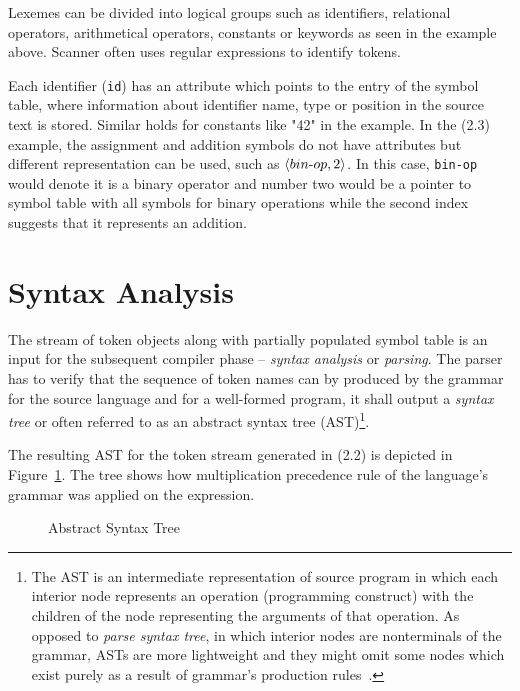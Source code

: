 \documentclass[
  digital, %
  table,   %
  lof,     %
  lot,     %
  oneside,
]{fithesis3}
\begin{document}
Lexemes can be divided into logical groups such as identifiers, relational operators, arithmetical operators, constants or keywords as seen in the example above. Scanner often uses regular expressions to identify tokens.

Each identifier (\texttt{id}) has an attribute which points to the entry of the symbol table, where information about identifier name, type or position in the source text is stored. Similar holds for constants like "42" in the example. In the (2.3) example, the assignment and addition symbols do not have attributes but different representation can be used, such as $ \langle bin \textnormal{-} op, 2 \rangle $. In this case, \texttt{bin-op} would denote it is a binary operator and number two would be a pointer to symbol table with all symbols for binary operations while the second index suggests that it represents an addition.

  \section{Syntax Analysis}
The stream of token objects along with partially populated symbol table is an input for the subsequent compiler phase -- \textit{syntax analysis} or \textit{parsing}. The parser has to verify that the sequence of token names can by produced by the grammar for the source language and for a well-formed program, it shall output a \textit{syntax tree} or often referred to as an abstract syntax tree (AST)\footnote{The AST is an intermediate representation of source program in which each interior node represents an operation (programming construct) with the children of the node representing the arguments of that operation. As opposed to \textit{parse syntax tree}, in which interior nodes are nonterminals of the grammar, ASTs are more lightweight and they might omit some nodes which exist purely as a result of grammar's production rules~\cite{secure-programming-with-sca}.}.

The resulting AST for the token stream generated in (2.2) is depicted in Figure~\ref{fig:compilers-abstract-syntax-tree}. The tree shows how multiplication precedence rule of the language's grammar was applied on the expression.

\begin{figure}
  \centering
  \caption{Abstract Syntax Tree}
  \label{fig:compilers-abstract-syntax-tree}
\end{figure}
\end{document}

